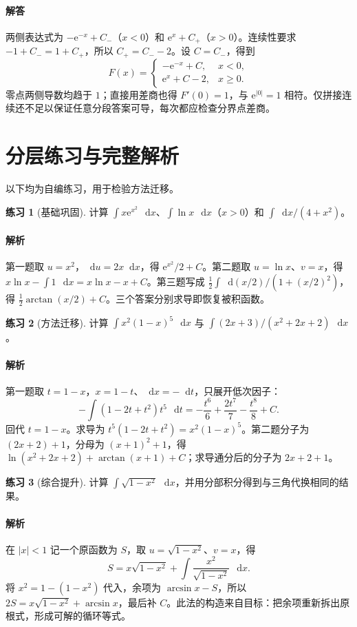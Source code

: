 \documentclass[UTF8,fontset=fandol,12pt,oneside,openany]{ctexrep}
\newcommand{\dd}{\mathop{}\!\mathrm d}
\newcommand{\ee}{\mathrm e}
\theoremstyle{definition}
\newtheorem{exercise}{练习}[chapter]
\begin{document}
\paragraph{解答}两侧表达式为 $-\ee^{-x}+C_-$（$x<0$）和 $\ee^x+C_+$（$x>0$）。连续性要求 $-1+C_-=1+C_+$，所以 $C_+=C_--2$。设 $C=C_-$，得到
\[
F(x)=\begin{cases}-\ee^{-x}+C,&x<0,\\ \ee^x+C-2,&x\ge0.\end{cases}
\]
零点两侧导数均趋于 $1$；直接用差商也得 $F'(0)=1$，与 $\ee^{|0|}=1$ 相符。仅拼接连续还不足以保证任意分段答案可导，每次都应检查分界点差商。

\section{分层练习与完整解析}
以下均为自编练习，用于检验方法迁移。
\begin{exercise}[基础巩固]
计算 $\int x\ee^{x^2}\,\dd x$、$\int\ln x\,\dd x$（$x>0$）和 $\int\dd x/(4+x^2)$。
\end{exercise}
\paragraph{解析}第一题取 $u=x^2$，$\dd u=2x\dd x$，得 $\ee^{x^2}/2+C$。第二题取 $u=\ln x$、$v=x$，得 $x\ln x-\int1\,\dd x=x\ln x-x+C$。第三题写成 $\frac12\int\dd(x/2)/(1+(x/2)^2)$，得 $\frac12\arctan(x/2)+C$。三个答案分别求导即恢复被积函数。

\begin{exercise}[方法迁移]
计算 $\int x^2(1-x)^5\,\dd x$ 与 $\int(2x+3)/(x^2+2x+2)\,\dd x$。
\end{exercise}
\paragraph{解析}第一题取 $t=1-x$，$x=1-t$、$\dd x=-\dd t$，只展开低次因子：
\[
-\int(1-2t+t^2)t^5\,\dd t
=-\frac{t^6}6+\frac{2t^7}7-\frac{t^8}8+C.
\]
回代 $t=1-x$。求导为 $t^5(1-2t+t^2)=x^2(1-x)^5$。第二题分子为 $(2x+2)+1$，分母为 $(x+1)^2+1$，得 $\ln(x^2+2x+2)+\arctan(x+1)+C$；求导通分后的分子为 $2x+2+1$。

\begin{exercise}[综合提升]
计算 $\int\sqrt{1-x^2}\,\dd x$，并用分部积分得到与三角代换相同的结果。
\end{exercise}
\paragraph{解析}在 $|x|<1$ 记一个原函数为 $S$，取 $u=\sqrt{1-x^2}$、$v=x$，得
\[
S=x\sqrt{1-x^2}+\int\frac{x^2}{\sqrt{1-x^2}}\,\dd x.
\]
将 $x^2=1-(1-x^2)$ 代入，余项为 $\arcsin x-S$，所以 $2S=x\sqrt{1-x^2}+\arcsin x$，最后补 $C$。此法的构造来自目标：把余项重新拆出原根式，形成可解的循环等式。
\end{document}
